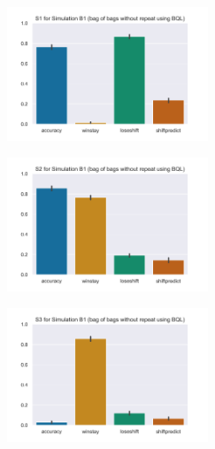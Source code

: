 \documentclass[10pt,letterpaper]{article}
\begin{document}
\begin{figure}[t]
\begin{subfigure}{0.33\textwidth}
\includegraphics[width=0.9\linewidth, height=4cm]{plots/simB1_s1.png} 
\label{fig:simB11}
\end{subfigure}
\begin{subfigure}{0.33\textwidth}
\includegraphics[width=0.9\linewidth, height=4cm]{plots/simB1_s2.png}
\label{fig:simB12}
\end{subfigure}
\begin{subfigure}{0.33\textwidth}
\includegraphics[width=0.9\linewidth, height=4cm]{plots/simB1_s3.png}
\label{fig:simB13}
\end{subfigure}


\end{figure}
\end{document}
